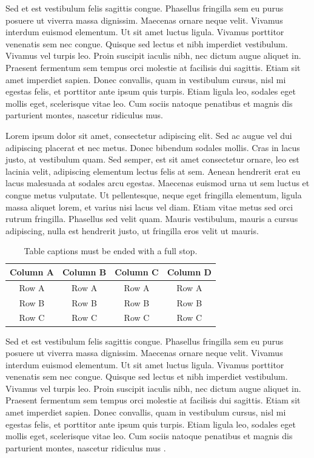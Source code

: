 Sed et est vestibulum felis sagittis congue. Phasellus fringilla sem eu purus 
posuere ut viverra massa dignissim. Maecenas ornare neque velit. Vivamus interdum 
euismod elementum. Ut sit amet luctus ligula. Vivamus porttitor venenatis sem nec 
congue. Quisque sed lectus et nibh imperdiet vestibulum. Vivamus vel turpis leo. 
Proin suscipit iaculis nibh, nec dictum augue aliquet in. Praesent fermentum sem 
tempus orci molestie at facilisis dui sagittis. Etiam sit amet imperdiet sapien. 
Donec convallis, quam in vestibulum cursus, nisl mi egestas felis, et porttitor 
ante ipsum quis turpis. Etiam ligula leo, sodales eget mollis eget, scelerisque 
vitae leo. Cum sociis natoque penatibus et magnis dis parturient montes, nascetur 
ridiculus mus. 

Lorem ipsum dolor sit amet, consectetur adipiscing elit. Sed ac augue vel dui 
adipiscing placerat et nec metus. Donec bibendum sodales mollis. Cras in lacus 
justo, at vestibulum quam. Sed semper, est sit amet consectetur ornare, leo est 
lacinia velit, adipiscing elementum lectus felis at sem. Aenean hendrerit erat eu 
lacus malesuada at sodales arcu egestas. Maecenas euismod urna ut sem luctus et 
congue metus vulputate. Ut pellentesque, neque eget fringilla elementum, ligula 
massa aliquet lorem, et varius nisi lacus vel diam. Etiam vitae metus sed orci 
rutrum fringilla. Phasellus sed velit quam. Mauris vestibulum, mauris a cursus 
adipiscing, nulla est hendrerit justo, ut fringilla eros velit ut mauris.

\begin{table}
{\setlength{\tabcolsep}{14pt}
\caption{Table captions must be ended with a full stop.}
\begin{center}
\vspace{-6mm}
\begin{tabular}{cccc}
\hline\hline
Column A & Column B & Column C & Column D \\
\hline
Row A & Row A & Row A & Row A \\
Row B & Row B & Row B & Row B \\
Row C & Row C & Row C & Row C \\
\hline
\end{tabular}
\vspace{-6mm}
\end{center}
\label{tableforCh2.3}}
\end{table}

Sed et est vestibulum felis sagittis congue. Phasellus fringilla sem eu purus 
posuere ut viverra massa dignissim. Maecenas ornare neque velit. Vivamus interdum 
euismod elementum. Ut sit amet luctus ligula. Vivamus porttitor venenatis sem nec 
congue. Quisque sed lectus et nibh imperdiet vestibulum. Vivamus vel turpis leo. 
Proin suscipit iaculis nibh, nec dictum augue aliquet in. Praesent fermentum sem 
tempus orci molestie at facilisis dui sagittis. Etiam sit amet imperdiet sapien. 
Donec convallis, quam in vestibulum cursus, nisl mi egestas felis, et porttitor 
ante ipsum quis turpis. Etiam ligula leo, sodales eget mollis eget, scelerisque 
vitae leo. Cum sociis natoque penatibus et magnis dis parturient montes, nascetur 
ridiculus mus . 
